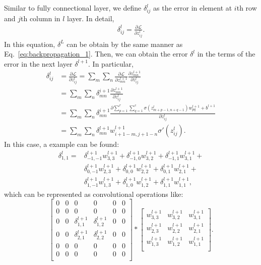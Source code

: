 \documentclass[10pt,onecolumn]{book}
\begin{document}
Similar to fully connectional layer, we define $\delta^l_{ij}$ as the error in element at $i$th row and $j$th column in $l$ layer. In detail, 
\begin{equation}
\begin{split}
\delta^l_{ij} = \frac{\partial \mathcal{L}}{\partial z^l_{ij}}.
\end{split}
\end{equation}
In this equation, $\delta^L$ can be obtain by the same manner as Eq.~\ref{eq:backpropagation_1}. Then, we can obtain the error $\delta^l$ in the terms of the error in the next layer $\delta^{l+1}$. In particular, 
\begin{equation}
\begin{split}
\delta^l_{ij} &= \frac{\partial \mathcal{L}}{\partial z^l_{ij}} 
= \sum_m \sum_n \frac{\partial \mathcal{L}}{\partial z^{l+1}_{mn}} \frac{\partial z^{l+1}_{mn}}{\partial z^l_{ij}} 
\\
&= \sum_m \sum_n \delta^{i+1}_{mn} \frac{\partial z^{l+1}_{mn}}{\partial z^l_{ij}} 
\\
&= \sum_m \sum_n \delta^{i+1}_{mn} \frac{\partial \sum^r_{p=1} \sum^c_{q=1} \sigma(z^{l}_{m+p-1,n+q-1}) w^{l+1}_{pq} + b^{l+1}}{\partial z^l_{ij}} 
\\
&= \sum_m \sum_n \delta^{l+1}_{mn} w^{l+1}_{i+1-m,j+1-n} \sigma'(z^l_{ij}).
\end{split}
\label{eq:convolutional_layer_backpropagation_2}
\tag{CONV-BP2}
\end{equation}
In this case, a example can be found:   
\begin{equation}
\begin{split}
\delta^l_{1,1} = & \delta^{l+1}_{-1,-1} w^{l+1}_{3,3} + \delta^{l+1}_{-1,0} w^{l+1}_{3,2} + \delta^{l+1}_{-1,1} w^{l+1}_{3,1} +  \\
&\delta^{l+1}_{0,-1} w^{l+1}_{2,3} + \delta^{l+1}_{0,0} w^{l+1}_{2,2} + \delta^{l+1}_{0,1} w^{l+1}_{2,1} + \\
&\delta^{l+1}_{1,-1} w^{l+1}_{1,3} + \delta^{l+1}_{1,0} w^{l+1}_{1,2} + \delta^{l+1}_{1,1} w^{l+1}_{1,1},
\end{split}
\end{equation}
which can be represented as convolutional operations like:
\begin{equation}
\left[
\begin{array}{cccccc}
0 & 0 & 0 & 0 & 0 & 0 \\
0 & 0 & 0 & 0 & 0 & 0 \\
0 & 0 & \delta^{l+1}_{1,1} & \delta^{l+1}_{1,2} & 0 & 0 \\
0 & 0 & \delta^{l+1}_{2,1} & \delta^{l+1}_{2,2} & 0 & 0 \\
0 & 0 & 0 & 0 & 0 & 0 \\
0 & 0 & 0 & 0 & 0 & 0 \\
\end{array}
\right]*
\left[
\begin{array}{ccc}
w^{l+1}_{3,3} & w^{l+1}_{3,2} & w^{l+1}_{3,1} \\
w^{l+1}_{2,3} & w^{l+1}_{2,2} & w^{l+1}_{2,1} \\
w^{l+1}_{1,3} & w^{l+1}_{1,2} & w^{l+1}_{1,1} \\
\end{array}
\right].
\end{equation}
\end{document}
